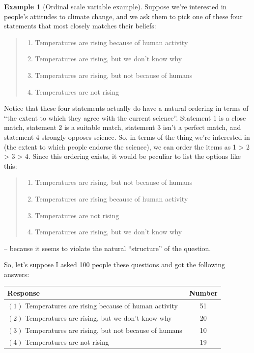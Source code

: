 \documentclass[
  11pt,
]{book}
\providecommand{\tightlist}{%
  \setlength{\itemsep}{0pt}\setlength{\parskip}{0pt}}
\theoremstyle{definition}
\theoremstyle{definition}
\newtheorem{example}{Example}[chapter]
\theoremstyle{definition}
\theoremstyle{definition}
\theoremstyle{remark}
\begin{document}
\begin{example}[Ordinal scale variable example]
\protect\hypertarget{exm:exordinal}{}\label{exm:exordinal}Suppose we're interested in people's attitudes to climate change, and we ask them to pick one of these four statements that most closely matches their beliefs:

\begin{quote}
\begin{enumerate}
\def\labelenumi{(\arabic{enumi})}
\tightlist
\item
  Temperatures are rising because of human activity
\item
  Temperatures are rising, but we don't know why
\item
  Temperatures are rising, but not because of humans
\item
  Temperatures are not rising
\end{enumerate}
\end{quote}

Notice that these four statements actually do have a natural ordering in terms of ``the extent to which they agree with the current science''. Statement 1 is a close match, statement 2 is a suitable match, statement 3 isn't a perfect match, and statement 4 strongly opposes science. So, in terms of the thing we're interested in (the extent to which people endorse the science), we can order the items as 1 \textgreater{} 2 \textgreater{} 3 \textgreater{} 4. Since this ordering exists, it would be peculiar to list the options like this:

\begin{quote}
\begin{enumerate}
\def\labelenumi{(\arabic{enumi})}
\setcounter{enumi}{2}
\tightlist
\item
  Temperatures are rising, but not because of humans
\item
  Temperatures are rising because of human activity
\item
  Temperatures are not rising
\item
  Temperatures are rising, but we don't know why
\end{enumerate}
\end{quote}

-- because it seems to violate the natural ``structure'' of the question.

So, let's suppose I asked 100 people these questions and got the following answers:

\begin{table}[H]
\centering
\begin{tabular}{lc}
\toprule
Response & Number\\
\midrule
$(1)$ Temperatures are rising because of human activity & 51\\
$(2)$ Temperatures are rising, but we don't know why & 20\\
$(3)$ Temperatures are rising, but not because of humans & 10\\
$(4)$ Temperatures are not rising & 19\\
\bottomrule
\end{tabular}
\end{table}


\end{example}
\end{document}
